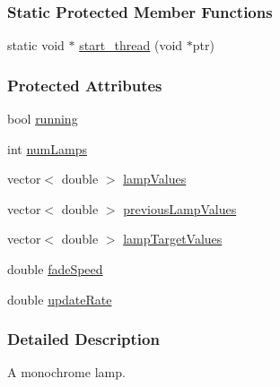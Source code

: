 \subsubsection*{\-Static \-Protected \-Member \-Functions}
\begin{DoxyCompactItemize}
\item 
static void $\ast$ \hyperlink{classLamps_ad6e04b6f320d75eacdcd45327bf8c80d}{start\-\_\-thread} (void $\ast$ptr)
\end{DoxyCompactItemize}
\subsubsection*{\-Protected \-Attributes}
\begin{DoxyCompactItemize}
\item 
bool \hyperlink{classLamps_a15b2fd60f5998f51d7b5e50e35c84329}{running}
\item 
int \hyperlink{classLamps_a64146e584dfa86281df86a37dd7cb772}{num\-Lamps}
\item 
vector$<$ double $>$ \hyperlink{classLamps_a12d0843f4f358ebd577089cb6c049076}{lamp\-Values}
\item 
vector$<$ double $>$ \hyperlink{classLamps_adc85fec25af923333458426f44504515}{previous\-Lamp\-Values}
\item 
vector$<$ double $>$ \hyperlink{classLamps_abf9da54471c9e73c99f955d75c7db949}{lamp\-Target\-Values}
\item 
double \hyperlink{classLamps_a77275168d36347133dec42259e88a1d4}{fade\-Speed}
\item 
double \hyperlink{classLamps_a31c7fbbc4d462b6b109f0c990e0e310f}{update\-Rate}
\end{DoxyCompactItemize}


\subsubsection{\-Detailed \-Description}
\-A monochrome lamp. 

